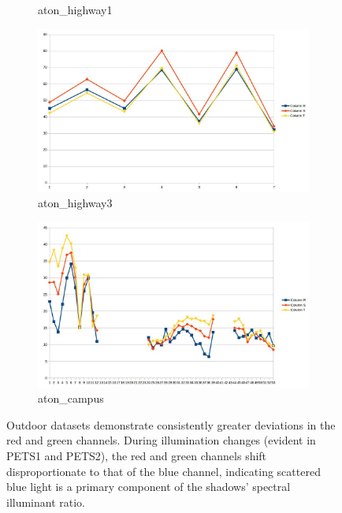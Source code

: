 \documentclass[12pt]{report}
\begin{document}
\begin{figure}
\begin{subfigure}{.49\linewidth}
  \caption{aton\_highway1}
\end{subfigure}
\hfill
\begin{subfigure}{.49\linewidth}
  \includegraphics[width=1\linewidth]{figures/rgshift_highway3.jpg}
  \caption{aton\_highway3}
\end{subfigure}
\hfill
\begin{subfigure}{.7\linewidth}
  \includegraphics[width=1\linewidth]{figures/rgshift_campus.jpg}
  \caption{aton\_campus}
\end{subfigure}

\caption{Outdoor datasets demonstrate consistently greater deviations in the red and green channels. During illumination changes (evident in PETS1 and PETS2), the red and green channels shift disproportionate to that of the blue channel, indicating scattered blue light is a primary component of the shadows' spectral illuminant ratio.}
\label{fig:rgshift_outdoor}
\end{figure}
\end{document}
